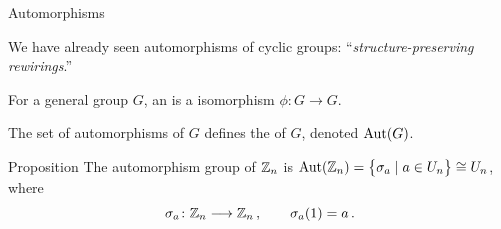 \documentclass[8pt, handout]{beamer}
\newcommand{\Pause}{}      %
\begin{document}

\begin{frame}{Automorphisms} %
  
  We have already seen automorphisms of cyclic groups:
  ``\emph{structure-preserving rewirings}.'' \medskip\Pause
  
  For a general group $G$, an  is a isomorphism
  $\phi\colon G\to G$. \medskip\Pause
  
  The set of automorphisms of $G$ defines the  of $G$, denoted $\operatorname{Aut}(G)$. \medskip\Pause
  
  \begin{block}{Proposition}
    The automorphism group of $\mathbb{Z}_n$ is $\operatorname{Aut}(\mathbb{Z}_n)=\big\{\sigma_a\mid
    a\in U_n\big\}\cong U_n$, where 
    \[
    \sigma_a\colon\mathbb{Z}_n\longrightarrow\mathbb{Z}_n\,,\qquad\sigma_a(1)=a\,.
    \]
  \end{block}
  
  \vspace{-4mm}


\end{frame}
\end{document}
